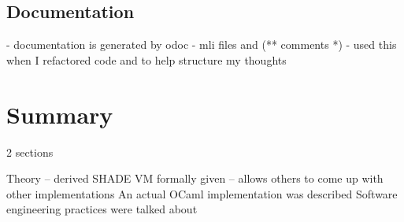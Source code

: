 \documentclass[class=article, crop=false]{standalone}
\begin{document}
\subsection{Documentation}
- documentation is generated by odoc
- mli files and (** comments *)
- used this when I refactored code and to help structure my thoughts

\section{Summary}

2 sections

Theory -- derived
SHADE VM formally given -- allows others to come up with other implementations
An actual OCaml implementation was described
Software engineering practices were talked about
\end{document}
